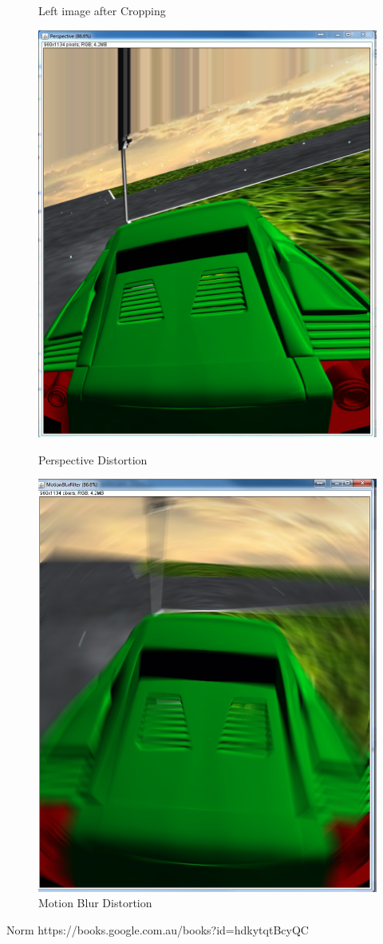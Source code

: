 \documentclass[]{article}
\begin{document}
\begin{itemize}
\begin{figure}[H]
            	\caption{Left image after Cropping}
            	\label{fig::left_image}
            \end{figure}
            \begin{figure}
            \centering
            \begin{minipage}{.5\textwidth}
              \centering
              \includegraphics[width=.7\linewidth]{Perspective.png}
              \caption{Perspective Distortion}
              \label{fig:Perspective}
            \end{minipage}%
            \begin{minipage}{.5\textwidth}
              \centering
              \includegraphics[width=.7\linewidth]{MotionBlur.jpg}
              \caption{Motion Blur Distortion}
              \label{fig:MotionBlur}
            \end{minipage}
            \end{figure}

            \end{itemize}

\newpage
\begin{thebibliography}{9}
Norm {https://books.google.com.au/books?id=hdkytqtBcyQC}
\end{thebibliography}
\end{document}
